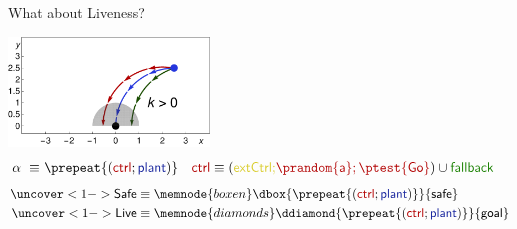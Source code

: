 \documentclass[slidestop,aspectratio=169]{beamer}
\newcommand{\avar}{{\sf a}\xspace}
\newcommand{\ctrl}{\textsf{ctrl}\xspace}
\newcommand{\plant}{\textsf{plant}\xspace}
\newcommand{\fallback}{\textsf{\upshape fallback}\xspace}
\newcommand{\extCtrl}{\textsf{\upshape extCtrl}\xspace}
\theoremstyle{plain}
\theoremstyle{definition}
\theoremstyle{remark}
\newcommand{\ctrlcolor}[1]{{\color{vred}{#1}}}
\newcommand{\extCtrlcolor}[1]{{\color{myyellow}{#1}}}
\newcommand{\fallbackcolor}[1]{{\color{vgreen}{#1}}}
\newcommand{\plantcolor}[1]{{\color{vblue}{#1}}}
\begin{document}
\begin{frame}[t]{What about Liveness?}
\noindent
\begin{center}
\includegraphics[width=0.4\textwidth]{graphics/fig-ode2.pdf}\\%
{\small\begin{align*}
\alpha~\equiv~& \prepeat{(\ctrlcolor{\ctrl}; \plantcolor{\plant})}\ \ \ \ctrlcolor{\ctrl} \equiv  (\extCtrlcolor{\extCtrl;} \ctrlcolor{\prandom{\avar}; \ptest{\admiss}}) \cup \fallbackcolor{\fallback}
\end{align*}}%
\begin{align*}
\uncover<1->{\textsf{Safe}} &\equiv \memnode{boxen}\dbox{\prepeat{(\ctrlcolor{\ctrl};\plantcolor{\plant})}}{\textsf{safe}}\\%
\uncover<1->{\textsf{Live}} &\equiv \memnode{diamonds}\ddiamond{\prepeat{(\ctrlcolor{\ctrl};\plantcolor{\plant})}}{\textsf{goal}}\\
\phantom{\textsf{Win}}  &\phantom{\equiv \ddiamond{\prepeat{(\ctrlcolor{\ctrl};\plantcolor{\plant};\ptest{\textsf{safe}})}}{\textsf{goal}}}%
\end{align*}
\end{center}
\end{frame}
\end{document}
